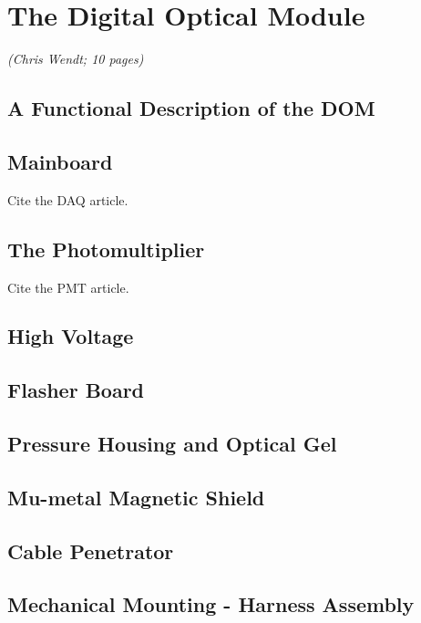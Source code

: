 
\section{The Digital Optical Module}
\textsl{(Chris Wendt; 10 pages)}

\subsection{A Functional Description of the DOM}

\subsection{Mainboard}
Cite the DAQ article\cite{ICECUBE:DAQ}.

\subsection{The Photomultiplier}
Cite the PMT article\cite{ICECUBE:PMT}.

\subsection{High Voltage}

\subsection{Flasher Board}

\subsection{Pressure Housing and Optical Gel}

\subsection{Mu-metal Magnetic Shield}

\subsection{Cable Penetrator}

\subsection{Mechanical Mounting - Harness Assembly}

